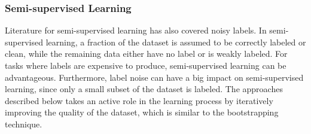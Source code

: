 











\subsubsection{Semi-supervised Learning}
Literature for semi-supervised learning has also covered noisy labels. In semi-supervised learning, a fraction of the dataset is assumed to be correctly labeled or clean, while the remaining data either have no label or is weakly labeled. For tasks where labels are expensive to produce, semi-supervised learning can be advantageous. Furthermore, label noise can have a big impact on semi-supervised learning, since only a small subset of the dataset is labeled. The approaches described below takes an active role in the learning process by iteratively improving the quality of the dataset, which is similar to the bootstrapping technique.\\

